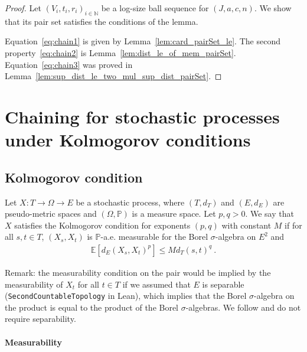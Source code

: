 \begin{proof}\leanok
Let $(V_i, t_i, r_i)_{i \in \mathbb{N}}$ be a log-size ball sequence for $(J, a, c, n)$. We show that its pair set satisfies the conditions of the lemma.

Equation~\eqref{eq:chain1} is given by Lemma~\ref{lem:card_pairSet_le}.
The second property~\eqref{eq:chain2} is Lemma~\ref{lem:dist_le_of_mem_pairSet}.
Equation~\eqref{eq:chain3} was proved in Lemma~\ref{lem:sup_dist_le_two_mul_sup_dist_pairSet}.
\end{proof}





\section{Chaining for stochastic processes under Kolmogorov conditions}

\subsection{Kolmogorov condition}

\begin{definition}\label{def:IsKolmogorovProcess}
  \leanok
Let $X : T \to \Omega \to E$ be a stochastic process, where $(T, d_T)$ and $(E, d_E)$ are pseudo-metric spaces and $(\Omega, \mathbb{P})$ is a measure space.
Let $p, q > 0$.
We say that $X$ satisfies the Kolmogorov condition for exponents $(p,q)$ with constant $M$ if for all $s, t \in T$, $(X_s, X_t)$ is $\mathbb{P}$-a.e. measurable for the Borel $\sigma$-algebra on $E^2$ and
\begin{align*}
  \mathbb{E}[d_E(X_s, X_t)^p] \le M d_T(s, t)^q
  \: .
\end{align*}
\end{definition}

Remark: the measurability condition on the pair would be implied by the measurability of $X_t$ for all $t \in T$ if we assumed that $E$ is separable (\texttt{SecondCountableTopology} in Lean), which implies that the Borel $\sigma$-algebra on the product is equal to the product of the Borel $\sigma$-algebras.
We follow \cite{kratschmer2023kolmogorov} and do not require separability.

\paragraph{Measurability}

